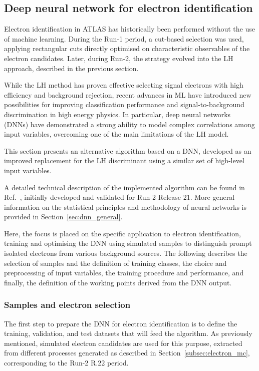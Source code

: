 \subsection{Deep neural network for electron identification}
\label{subsec:dnn_id}

Electron identification in ATLAS has historically been performed without the use of machine learning. During the Run-1 period, a cut-based selection was used, applying rectangular cuts directly optimised on characteristic observables of the electron candidates. Later, during Run-2, the strategy evolved into the LH approach, described in the previous section.

While the LH method has proven effective selecting signal electrons with high efficiency and background rejection, recent advances in ML have introduced new possibilities for improving classification performance and signal-to-background discrimination in high energy physics. In particular, deep neural networks (DNNs) have demonstrated a strong ability to model complex correlations among input variables, overcoming one of the main limitations of the LH model.

This section presents an alternative algorithm based on a DNN, developed as an improved replacement for the LH discriminant using a similar set of high-level input variables.

A detailed technical description of the implemented algorithm can be found in Ref.~\cite{dnn_paper}, initially developed and validated for Run-2 Release 21. More general information on the statistical principles and methodology of neural networks is provided in Section~\ref{sec:dnn_general}.

Here, the focus is placed on the specific application to electron identification, training and optimising the DNN using simulated samples to distinguish prompt isolated electrons from various background sources. The following describes the selection of samples and the definition of training classes, the choice and preprocessing of input variables, the training procedure and performance, and finally, the definition of the working points derived from the DNN output.

\subsubsection{Samples and electron selection}
The first step to prepare the DNN for electron identification is to define the training, validation, and test datasets that will feed the algorithm. As previously mentioned, simulated electron candidates are used for this purpose, extracted from different processes generated as described in Section~\ref{subsec:electron_mc}, corresponding to the Run-2 R.22 period.

